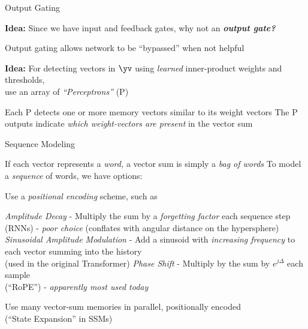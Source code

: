 \begin{slide}[\slideopts,toc={Skip Connection}]{Output Gating}

  \vspace{-1em}

  \textbf{Idea:} Since we have input and feedback gates, why not an \textbf{\emph{output gate?}}


\maybepause
Output gating allows network to be ``bypassed'' when not helpful

\maybepause
\vspace{1em}
\textbf{Idea:} For detecting vectors in $\yv$ using \emph{learned} inner-product weights and thresholds,\\
use an array of \emph{``Perceptrons''} (P)
\begin{itemize}
\mpitem Each P detects one or more memory vectors similar to its weight vectors
\mpitem The P outputs indicate \emph{which weight-vectors are present} in the vector sum
\end{itemize}

\end{slide}

\begin{slide}[\slideopts,toc={Sequences}]{Sequence Modeling}
  \vspace{-1em}
  \begin{itemize}
    \mpitem If each vector represents a \emph{word,} a vector sum is simply a \emph{bag of words}
    \mpitem To model a \emph{sequence} of words, we have options:
    \begin{enumerate}
      \mpitem Use a \emph{positional encoding} scheme, such as
      \begin{enumerate}
        \mpitem \emph{Amplitude Decay} - Multiply the sum by a \emph{forgetting factor} each sequence step\\
        (RNNs) - \emph{poor choice} (conflates with angular distance on the hypersphere)
        \mpitem \emph{Sinusoidal Amplitude Modulation} - Add a sinusoid with \emph{increasing frequency} to each vector summing into the history\\
        (used in the original Transformer)
        \mpitem \emph{Phase Shift} - Multiply by the sum by $e^{j\Delta}$ each sample\\
        (``RoPE'') - \emph{apparently most used today}
      \end{enumerate}
      \mpitem Use many vector-sum memories in parallel, positionally encoded\\
      (``State Expansion'' in SSMs)
    \end{enumerate}
  \end{itemize}
\end{slide}

